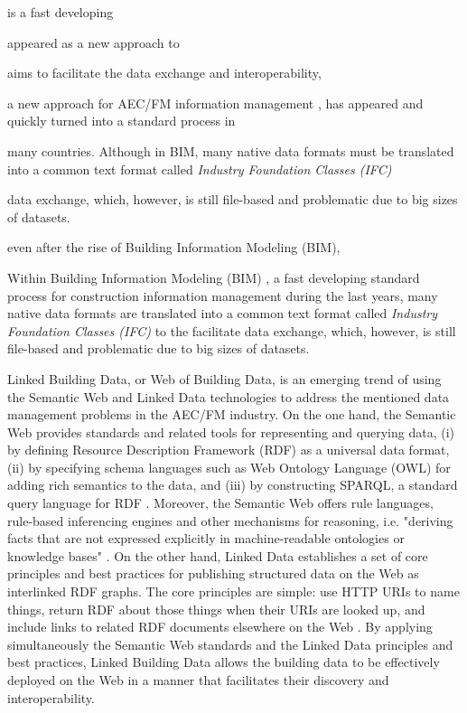 is a fast developing 



appeared as a new approach to 

aims to facilitate the data exchange and interoperability, 

a new approach for AEC/FM information management \cite{eastman2011bim}, has appeared and quickly turned into a standard process in 

many countries. 
Although in BIM, many native data formats must be translated into a common text format called \emph{Industry Foundation Classes (IFC)} \cite{liebich2016ifc4} 

data exchange, which, however, is still file-based and problematic due to big sizes of datasets. 


even after the rise of Building Information Modeling (BIM), 


Within Building Information Modeling (BIM) \cite{eastman2011bim}, a fast developing standard process for construction information management during the last years, many native data formats are translated into a common text format called \emph{Industry Foundation Classes (IFC)} \cite{liebich2016ifc4} to the facilitate data exchange, which, however, is still file-based and problematic due to big sizes of datasets. 




Linked Building Data, or Web of Building Data, is an emerging trend of using the Semantic Web and Linked Data technologies to address the mentioned data management problems in the AEC/FM industry.
On the one hand, the Semantic Web provides standards and related tools for representing and querying data,
(i) by defining Resource Description Framework (RDF) as a universal data format,
(ii) by specifying schema languages such as Web Ontology Language (OWL) for adding rich semantics to the data,
and (iii) by constructing SPARQL, a standard query language for RDF \cite{polleres2013rdfs}.
Moreover, the Semantic Web offers rule languages, rule-based inferencing engines and other mechanisms for reasoning, i.e. "deriving facts that are not expressed explicitly in machine-readable ontologies or knowledge bases" \cite{sikos2015mastering}.
On the other hand, Linked Data establishes a set of core principles and best practices for publishing structured data on the Web as interlinked RDF graphs.
The core principles are simple: use HTTP URIs to name things, return RDF about those things when their URIs are looked up, and include links to related RDF documents elsewhere on the Web \cite{bizer2009linked, hogan2014linked, polleres2013rdfs}.
By applying simultaneously the Semantic Web standards and the Linked Data principles and best practices, Linked Building Data allows the building data to be effectively deployed on the Web in a manner that facilitates their discovery and interoperability.




